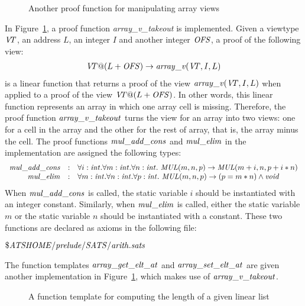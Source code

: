 \begin{figure}

\caption{Another proof function for manipulating array views}
\label{figure:array_v_takeout.dats}
\end{figure}
In Figure~\ref{figure:array_v_takeout.dats}, a proof function {\it
array\_v\_takeout} is implemented.
Given a viewtype ${\it V\!\!T}$, an address $L$, an integer $I$ and another integer
${\it OFS}$, a proof of the following view:
\[\begin{array}{c}
{\it V\!\!T} @ (L+{\it OFS}) \rightarrow {\it array\_v} ({\it V\!\!T}, I, L)
\end{array}\]
is a linear function that returns a proof of the view ${\it array\_v} ({\it V\!\!T},
I, L)$ when applied to a proof of the view $\VT@(L+{\it OFS})$. In other
words, this linear function represents an array in which one array cell is
missing.  Therefore, the proof function ${\it array\_v\_takeout}$ turns the
view for an array into two views: one for a cell in the array and the other
for the rest of array, that is, the array minus the cell.
The proof functions ${\it
mul\_add\_cons}$ and ${\it mul\_elim}$ in the implementation are assigned
the following types:
\[\begin{array}{rcl}
{\it mul\_add\_cons} & : &
\forall i:{\it int}.\forall m:{\it int}.\forall n:{\it int}.~{\it MUL}(m,n,p)\rightarrow {\it MUL}(m+i,n,p+i*n) \\
{\it mul\_elim} & : &
\forall m:{\it int}.\forall n:{\it int}.\forall p:{\it int}.~{\it MUL} (m, n, p)\rightarrow (p = m*n)\land{\it void} \\
\end{array}\]
When ${\it mul\_add\_cons}$ is called, the static variable $i$ should be
instantiated with an integer constant. Similarly, when ${\it mul\_elim}$ is
called, either the static variable $m$ or the static variable $n$ should be
instantiated with a constant. These two functions are declared as axioms in
the following file:
\begin{center}
${\it \$ATSHOME/prelude/SATS/arith.sats}$
\end{center}
The function templates ${\it array\_get\_elt\_at}$ and ${\it
array\_set\_elt\_at}$ are given another implementation in
Figure~\ref{figure:array_v_takeout.dats}, which makes use of ${\it
array\_v\_takeout}$.

\begin{figure}

\caption{A function template for computing the length of a given linear list}
\label{figure:list_vt_length.dats}
\end{figure}
